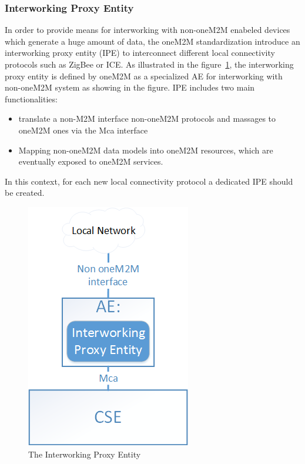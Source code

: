 \subsubsection{Interworking Proxy Entity}
In order to provide means for interworking with non-oneM2M enabeled devices which generate a huge amount of data, the oneM2M standardization introduce an interworking proxy entity (IPE) to interconnect different local connectivity protocols such as ZigBee or ICE. As illustrated in the figure~\ref{fig:contrib1:goal}, the interworking proxy entity is defined by oneM2M as a specialized AE for interworking with non-oneM2M system as showing in the figure. IPE includes two main functionalities:  
\begin{itemize}
\item translate a non-M2M interface non-oneM2M protocols and massages to oneM2M ones via the Mca interface
\item Mapping non-oneM2M data models into oneM2M resources, which are eventually exposed to oneM2M services.
\end{itemize}\par
In this context, for each new local connectivity protocol a dedicated IPE should be created. 
\begin{figure}[htbp]
    \centering
    \includegraphics[width=.4\textwidth]{resources/images/ipe}
    \caption{The Interworking Proxy Entity}\label{fig:contrib1:goal}
\end{figure}
